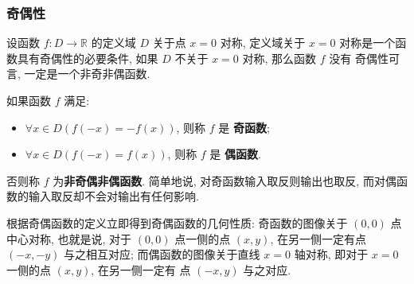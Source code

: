 \documentclass[10pt,UTF8]{book} %
\begin{document}
\subsubsection{奇偶性}

设函数 $f: D \to \mathbb{R}$ 的定义域 $D$ 关于点 $x = 0$ 对称, 定义域关于 $x=0$
对称是一个函数具有奇偶性的必要条件, 如果 $D$ 不关于 $x=0$ 对称, 那么函数 $f$ 没有
奇偶性可言, 一定是一个非奇非偶函数.

\begin{definition}[奇函数和偶函数]
    如果函数 $f$ 满足:
    \begin{itemize}[itemsep=0pt]
        \item $\forall x \in D \left(
            f(-x) = -f(x)
        \right)$, 则称 $f$ 是 \textbf{奇函数};
        \item $\forall x \in D \left(
            f(-x) = f(x)
        \right)$, 则称 $f$ 是 \textbf{偶函数}.
    \end{itemize}
    否则称 $f$ 为\textbf{非奇偶非偶函数}.
    简单地说, 对奇函数输入取反则输出也取反, 而对偶函数的输入取反却不会对输出有任何影响.
\end{definition}

根据奇偶函数的定义立即得到奇偶函数的几何性质: 奇函数的图像关于 $(0,0)$ 点中心对称,
也就是说, 对于 $(0,0)$ 点一侧的点 $(x,y)$, 在另一侧一定有点 $(-x,-y)$ 与之相互对应;
而偶函数的图像关于直线 $x=0$ 轴对称, 即对于 $x=0$ 一侧的点 $(x,y)$, 在另一侧一定有
点 $(-x,y)$ 与之对应.
\end{document}
